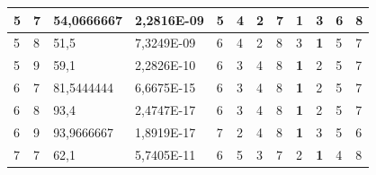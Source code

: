 \documentclass[conference]{IEEEtran}
\begin{document}
\begin{table}[]
\begin{tabular}{|llll|llllllll|}
		\multicolumn{1}{|l|}{5}   & \multicolumn{1}{l|}{7}         & \multicolumn{1}{l|}{54,0666667}    & 2,2816E-09 & \multicolumn{1}{l|}{5}          & \multicolumn{1}{l|}{4}          & \multicolumn{1}{l|}{2}          & \multicolumn{1}{l|}{7}   & \multicolumn{1}{l|}{\textbf{1}} & \multicolumn{1}{l|}{3}          & \multicolumn{1}{l|}{6}   & 8                      \\ \hline
		\multicolumn{1}{|l|}{5}   & \multicolumn{1}{l|}{8}         & \multicolumn{1}{l|}{51,5}          & 7,3249E-09 & \multicolumn{1}{l|}{6}          & \multicolumn{1}{l|}{4}          & \multicolumn{1}{l|}{2}          & \multicolumn{1}{l|}{8}   & \multicolumn{1}{l|}{3}          & \multicolumn{1}{l|}{\textbf{1}} & \multicolumn{1}{l|}{5}   & 7                      \\ \hline
		\multicolumn{1}{|l|}{5}   & \multicolumn{1}{l|}{9}         & \multicolumn{1}{l|}{59,1}          & 2,2826E-10 & \multicolumn{1}{l|}{6}          & \multicolumn{1}{l|}{3}          & \multicolumn{1}{l|}{4}          & \multicolumn{1}{l|}{8}   & \multicolumn{1}{l|}{\textbf{1}} & \multicolumn{1}{l|}{2}          & \multicolumn{1}{l|}{5}   & 7                      \\ \hline
		\multicolumn{1}{|l|}{6}   & \multicolumn{1}{l|}{7}         & \multicolumn{1}{l|}{81,5444444}    & 6,6675E-15 & \multicolumn{1}{l|}{6}          & \multicolumn{1}{l|}{3}          & \multicolumn{1}{l|}{4}          & \multicolumn{1}{l|}{8}   & \multicolumn{1}{l|}{\textbf{1}} & \multicolumn{1}{l|}{2}          & \multicolumn{1}{l|}{5}   & 7                      \\ \hline
		\multicolumn{1}{|l|}{6}   & \multicolumn{1}{l|}{8}         & \multicolumn{1}{l|}{93,4}          & 2,4747E-17 & \multicolumn{1}{l|}{6}          & \multicolumn{1}{l|}{3}          & \multicolumn{1}{l|}{4}          & \multicolumn{1}{l|}{8}   & \multicolumn{1}{l|}{\textbf{1}} & \multicolumn{1}{l|}{2}          & \multicolumn{1}{l|}{5}   & 7                      \\ \hline
		\multicolumn{1}{|l|}{6}   & \multicolumn{1}{l|}{9}         & \multicolumn{1}{l|}{93,9666667}    & 1,8919E-17 & \multicolumn{1}{l|}{7}          & \multicolumn{1}{l|}{2}          & \multicolumn{1}{l|}{4}          & \multicolumn{1}{l|}{8}   & \multicolumn{1}{l|}{\textbf{1}} & \multicolumn{1}{l|}{3}          & \multicolumn{1}{l|}{5}   & 6                      \\ \hline
		\multicolumn{1}{|l|}{7}   & \multicolumn{1}{l|}{7}         & \multicolumn{1}{l|}{62,1}          & 5,7405E-11 & \multicolumn{1}{l|}{6}          & \multicolumn{1}{l|}{5}          & \multicolumn{1}{l|}{3}          & \multicolumn{1}{l|}{7}   & \multicolumn{1}{l|}{2}          & \multicolumn{1}{l|}{\textbf{1}} & \multicolumn{1}{l|}{4}   & 8                      \\ \hline

\end{tabular}
\end{table}
\end{document}
